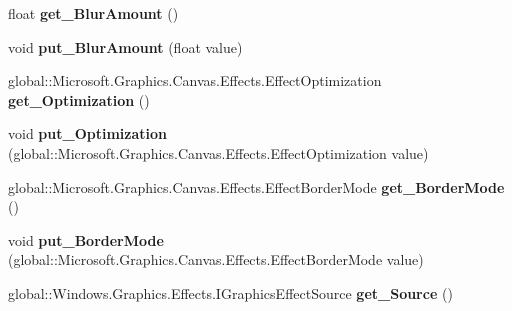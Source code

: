 \begin{DoxyCompactItemize}
float {\bfseries get\+\_\+\+Blur\+Amount} ()
\item 
\mbox{\label{class_microsoft_1_1_graphics_1_1_canvas_1_1_effects_1_1_gaussian_blur_effect_a1dcdfb69af9895c2333497a0d1b4edde}} 
void {\bfseries put\+\_\+\+Blur\+Amount} (float value)
\item 
\mbox{\label{class_microsoft_1_1_graphics_1_1_canvas_1_1_effects_1_1_gaussian_blur_effect_aef6c39bc362d054ffa0e6349d24f02cd}} 
global\+::\+Microsoft.\+Graphics.\+Canvas.\+Effects.\+Effect\+Optimization {\bfseries get\+\_\+\+Optimization} ()
\item 
\mbox{\label{class_microsoft_1_1_graphics_1_1_canvas_1_1_effects_1_1_gaussian_blur_effect_af7fd358991e46db4322e11d372de3181}} 
void {\bfseries put\+\_\+\+Optimization} (global\+::\+Microsoft.\+Graphics.\+Canvas.\+Effects.\+Effect\+Optimization value)
\item 
\mbox{\label{class_microsoft_1_1_graphics_1_1_canvas_1_1_effects_1_1_gaussian_blur_effect_a1fe5f86a30992bc3bf2477a872efde7a}} 
global\+::\+Microsoft.\+Graphics.\+Canvas.\+Effects.\+Effect\+Border\+Mode {\bfseries get\+\_\+\+Border\+Mode} ()
\item 
\mbox{\label{class_microsoft_1_1_graphics_1_1_canvas_1_1_effects_1_1_gaussian_blur_effect_af4c57d16f0f76baf8d713b866be1aa8e}} 
void {\bfseries put\+\_\+\+Border\+Mode} (global\+::\+Microsoft.\+Graphics.\+Canvas.\+Effects.\+Effect\+Border\+Mode value)
\item 
\mbox{\label{class_microsoft_1_1_graphics_1_1_canvas_1_1_effects_1_1_gaussian_blur_effect_af0d443d7aeeb6d8541a6d4b8d0a7d372}} 
global\+::\+Windows.\+Graphics.\+Effects.\+I\+Graphics\+Effect\+Source {\bfseries get\+\_\+\+Source} ()
\item 
\mbox{\label{class_microsoft_1_1_graphics_1_1_canvas_1_1_effects_1_1_gaussian_blur_effect_add0eb1e5c62d97e901bb02b01de846c2}} 

\end{DoxyCompactItemize}
